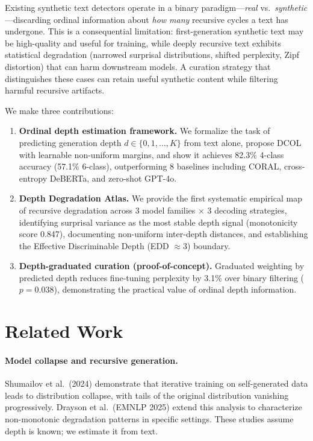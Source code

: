 \documentclass[11pt,a4paper]{article}
\begin{document}
Existing synthetic text detectors operate in a binary paradigm---\emph{real} vs.\ \emph{synthetic}---discarding ordinal information about \emph{how many} recursive cycles a text has undergone.
This is a consequential limitation: first-generation synthetic text may be high-quality and useful for training, while deeply recursive text exhibits statistical degradation (narrowed surprisal distributions, shifted perplexity, Zipf distortion) that can harm downstream models.
A curation strategy that distinguishes these cases can retain useful synthetic content while filtering harmful recursive artifacts.

We make three contributions:

\begin{enumerate}[leftmargin=*,topsep=2pt,itemsep=1pt]
\item \textbf{Ordinal depth estimation framework.} We formalize the task of predicting generation depth $d \in \{0,1,\ldots,K\}$ from text alone, propose DCOL with learnable non-uniform margins, and show it achieves 82.3\% 4-class accuracy (57.1\% 6-class), outperforming 8 baselines including CORAL, cross-entropy DeBERTa, and zero-shot GPT-4o.

\item \textbf{Depth Degradation Atlas.} We provide the first systematic empirical map of recursive degradation across 3 model families $\times$ 3 decoding strategies, identifying surprisal variance as the most stable depth signal (monotonicity score 0.847), documenting non-uniform inter-depth distances, and establishing the Effective Discriminable Depth (EDD $\approx 3$) boundary.

\item \textbf{Depth-graduated curation (proof-of-concept).} Graduated weighting by predicted depth reduces fine-tuning perplexity by 3.1\% over binary filtering ($p=0.038$), demonstrating the practical value of ordinal depth information.
\end{enumerate}

\section{Related Work}
\label{sec:related}

\paragraph{Model collapse and recursive generation.}
Shumailov et al.\ (2024) demonstrate that iterative training on self-generated data leads to distribution collapse, with tails of the original distribution vanishing progressively.
Drayson et al.\ (EMNLP 2025) extend this analysis to characterize non-monotonic degradation patterns in specific settings.
These studies assume depth is known; we estimate it from text.
\end{document}
